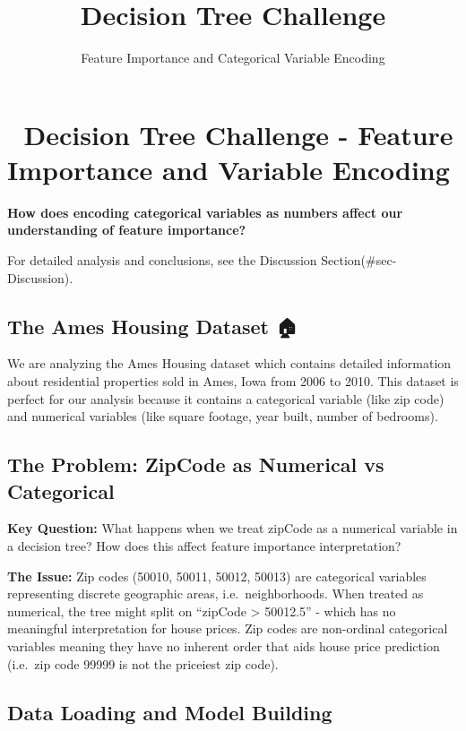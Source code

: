 \documentclass[
  letterpaper,
  DIV=11,
  numbers=noendperiod]{scrartcl}
\title{Decision Tree Challenge}
\subtitle{Feature Importance and Categorical Variable Encoding}
\author{}
\date{}
\begin{document}
\maketitle


\section{🌳 Decision Tree Challenge - Feature Importance and Variable
Encoding}\label{decision-tree-challenge---feature-importance-and-variable-encoding}

\textbf{How does encoding categorical variables as numbers affect our
understanding of feature importance?}

For detailed analysis and conclusions, see the Discussion
Section(\#sec-Discussion).

\subsection{The Ames Housing Dataset 🏠}\label{the-ames-housing-dataset}

We are analyzing the Ames Housing dataset which contains detailed
information about residential properties sold in Ames, Iowa from 2006 to
2010. This dataset is perfect for our analysis because it contains a
categorical variable (like zip code) and numerical variables (like
square footage, year built, number of bedrooms).

\subsection{The Problem: ZipCode as Numerical vs
Categorical}\label{the-problem-zipcode-as-numerical-vs-categorical}

\textbf{Key Question:} What happens when we treat zipCode as a numerical
variable in a decision tree? How does this affect feature importance
interpretation?

\textbf{The Issue:} Zip codes (50010, 50011, 50012, 50013) are
categorical variables representing discrete geographic areas,
i.e.~neighborhoods. When treated as numerical, the tree might split on
``zipCode \textgreater{} 50012.5'' - which has no meaningful
interpretation for house prices. Zip codes are non-ordinal categorical
variables meaning they have no inherent order that aids house price
prediction (i.e.~zip code 99999 is not the priceiest zip code).

\subsection{Data Loading and Model
Building}\label{data-loading-and-model-building}
\end{document}
